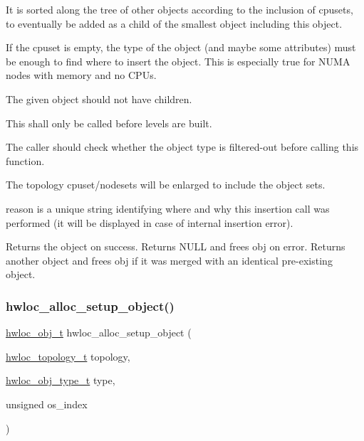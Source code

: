 It is sorted along the tree of other objects according to the inclusion of cpusets, to eventually be added as a child of the smallest object including this object.

If the cpuset is empty, the type of the object (and maybe some attributes) must be enough to find where to insert the object. This is especially true for N\+U\+MA nodes with memory and no C\+P\+Us.

The given object should not have children.

This shall only be called before levels are built.

The caller should check whether the object type is filtered-\/out before calling this function.

The topology cpuset/nodesets will be enlarged to include the object sets.

{\ttfamily reason} is a unique string identifying where and why this insertion call was performed (it will be displayed in case of internal insertion error).

Returns the object on success. Returns N\+U\+LL and frees obj on error. Returns another object and frees obj if it was merged with an identical pre-\/existing object. \mbox{\label{a00230_ga0b5c75b2dc37cea2e8a29c4812baf4b3}} 
\subsubsection{\texorpdfstring{hwloc\+\_\+alloc\+\_\+setup\+\_\+object()}{hwloc\_alloc\_setup\_object()}}
{\footnotesize\ttfamily \hyperlink{a00185_ga79b8ab56877ef99ac59b833203391c7d}{hwloc\+\_\+obj\+\_\+t} hwloc\+\_\+alloc\+\_\+setup\+\_\+object (\begin{DoxyParamCaption}\item[{\hyperlink{a00186_ga9d1e76ee15a7dee158b786c30b6a6e38}{hwloc\+\_\+topology\+\_\+t}}]{topology,  }\item[{\hyperlink{a00184_gacd37bb612667dc437d66bfb175a8dc55}{hwloc\+\_\+obj\+\_\+type\+\_\+t}}]{type,  }\item[{unsigned}]{os\+\_\+index }\end{DoxyParamCaption})}



